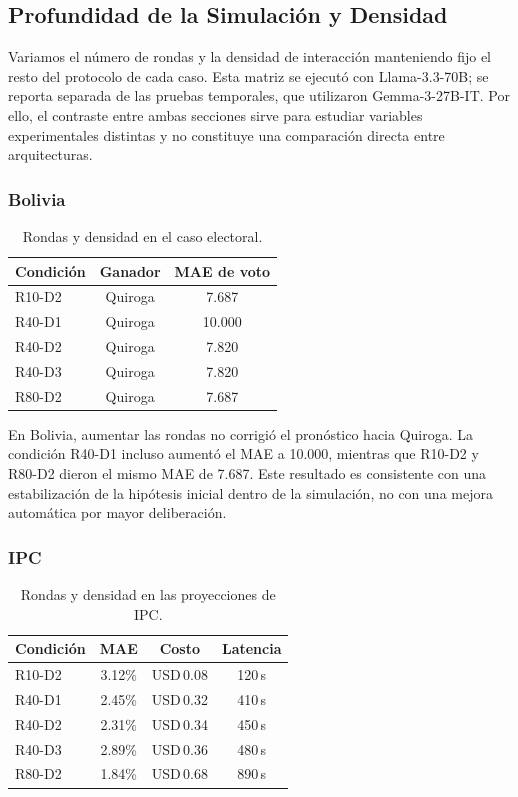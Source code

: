 ﻿\documentclass{article}
\begin{document}
\subsection{Profundidad de la Simulación y Densidad}

Variamos el número de rondas y la densidad de interacción manteniendo fijo el resto del protocolo de cada caso. Esta matriz se ejecutó con Llama-3.3-70B; se reporta separada de las pruebas temporales, que utilizaron Gemma-3-27B-IT. Por ello, el contraste entre ambas secciones sirve para estudiar variables experimentales distintas y no constituye una comparación directa entre arquitecturas.

\subsubsection{Bolivia}
\begin{table}[H]
    \centering
    \small
    \begin{tabular}{@{}lcc@{}}
        \toprule
        \textbf{Condición} & \textbf{Ganador} & \textbf{MAE de voto} \\ \midrule
        R10-D2 & Quiroga & 7.687 \\
        R40-D1 & Quiroga & 10.000 \\
        R40-D2 & Quiroga & 7.820 \\
        R40-D3 & Quiroga & 7.820 \\
        R80-D2 & Quiroga & 7.687 \\ \bottomrule
    \end{tabular}
    \caption{Rondas y densidad en el caso electoral.}
    \label{tab:rondas_bolivia}
\end{table}

En Bolivia, aumentar las rondas no corrigió el pronóstico hacia Quiroga. La condición R40-D1 incluso aumentó el MAE a 10.000, mientras que R10-D2 y R80-D2 dieron el mismo MAE de 7.687. Este resultado es consistente con una estabilización de la hipótesis inicial dentro de la simulación, no con una mejora automática por mayor deliberación.

\subsubsection{IPC}
\begin{table}[H]
    \centering
    \small
    \begin{tabular}{@{}lccc@{}}
        \toprule
        \textbf{Condición} & \textbf{MAE} & \textbf{Costo} & \textbf{Latencia} \\ \midrule
        R10-D2 & 3.12\% & USD\,0.08 & 120\,s \\
        R40-D1 & 2.45\% & USD\,0.32 & 410\,s \\
        R40-D2 & 2.31\% & USD\,0.34 & 450\,s \\
        R40-D3 & 2.89\% & USD\,0.36 & 480\,s \\
        R80-D2 & 1.84\% & USD\,0.68 & 890\,s \\ \bottomrule
    \end{tabular}
    \caption{Rondas y densidad en las proyecciones de IPC.}
    \label{tab:rondas_ipc}
\end{table}
\end{document}
